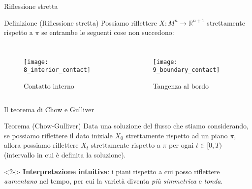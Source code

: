\begin{frame}{Riflessione stretta}{}
	\begin{block}{Definizione (Riflessione stretta)}
		 Possiamo riflettere $X : M^n \rightarrow \mathbb{R}^{n+1}$ strettamente rispetto a $\pi$ se entrambe le seguenti cose non succedono:
	\end{block}


	\begin{columns}
		\begin{figure}
			\begin{center}
				\texttt{[image: 8\_interior\_contact]}
				\caption{Contatto interno}
			\end{center}
		\end{figure}
		\begin{figure}
			\begin{center}
				\texttt{[image: 9\_boundary\_contact]}
				\caption{Tangenza al bordo}
			\end{center}
		\end{figure}
	\end{columns}
\end{frame}




\begin{frame}{Il teorema di Chow e Gulliver}{}
	\begin{block}{Teorema (Chow-Gulliver)}
		Data una soluzione del flusso che stiamo considerando, se possiamo riflettere il dato iniziale $X_0$ strettamente rispetto ad un piano $\pi$, allora possiamo riflettere $X_t$ strettamente rispetto a $\pi$ per ogni $t\in [0,T)$ (intervallo in cui è definita la soluzione). 
	\end{block}
	\begin{block}{}<2->
		\textbf{Interpretazione intuitiva}: i piani rispetto a cui posso riflettere \textit{aumentano} nel tempo, per cui la varietà diventa \textit{più simmetrica} e \textit{tonda}. 
	\end{block}
\end{frame}